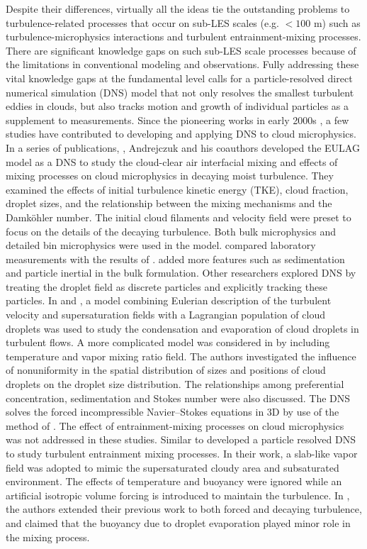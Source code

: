 \documentclass[draft,jgrga]{AGUTeX}
\begin{document}
\begin{article}
Despite their differences, virtually all the ideas tie the outstanding problems to turbulence-related processes that occur on sub-LES scales (e.g. $< 100$ m) such as turbulence-microphysics interactions and turbulent entrainment-mixing processes. There are significant knowledge gaps on such sub-LES scale processes because of the limitations in conventional modeling and observations. Fully addressing these vital knowledge gaps at the fundamental level calls for a particle-resolved direct numerical simulation (DNS) model that not only resolves the smallest turbulent eddies in clouds, but also tracks motion and growth of individual particles as a supplement to measurements. Since the pioneering works in early 2000s \cite{Vaillancourt00, Vaillancourt02}, a few studies have contributed to developing and applying DNS to cloud microphysics. In a series of publications, \cite{And04, And06, And09}, Andrejczuk and his coauthors developed the EULAG model as a DNS to study the cloud-clear air interfacial mixing and effects of mixing processes on cloud microphysics in decaying moist turbulence. They examined the effects of initial turbulence kinetic energy (TKE), cloud fraction, droplet sizes, and the relationship between the mixing mechanisms and the Damk\"{o}hler number. The initial cloud filaments and velocity field were preset to focus on the details of the decaying turbulence. Both bulk microphysics and detailed bin microphysics were used in the model. \cite{Malinowski2008} compared laboratory measurements with the results of \cite{And04, And06}. \cite{LozarMellado2013} added more features such as sedimentation and particle inertial in the bulk formulation. Other researchers explored DNS by treating the droplet field as discrete particles and explicitly tracking these particles. In \cite{Lanotte2009} and \cite{Celani05}, a model combining Eulerian description of the turbulent velocity and supersaturation fields with a Lagrangian population of cloud droplets was used to study the condensation and evaporation of cloud droplets in turbulent flows. A more complicated model was considered in \cite{Vaillancourt00, Vaillancourt02} by including temperature and vapor mixing ratio field. The authors investigated the influence of nonuniformity in the spatial distribution of sizes and positions of cloud droplets on the droplet size distribution. The relationships among preferential concentration, sedimentation and Stokes number were also discussed. The DNS solves the forced incompressible Navier–Stokes equations in 3D by use of the method of \cite{Sullivan1994}. The effect of entrainment-mixing processes on cloud microphysics was not addressed in these studies. Similar to \cite{Vaillancourt02, Lanotte2009, Kumar11, Kumar12} developed a particle resolved DNS to study turbulent entrainment mixing processes. In their work, a slab-like vapor field was adopted to mimic the supersaturated cloudy area and subsaturated environment. The effects of temperature and buoyancy were ignored while an artificial isotropic volume forcing is introduced to maintain the turbulence. In \cite{Kumar14}, the authors extended their previous work to both forced and decaying turbulence, and claimed that the buoyancy due to droplet evaporation played minor role in the mixing process. 


\end{article}
\end{document}
